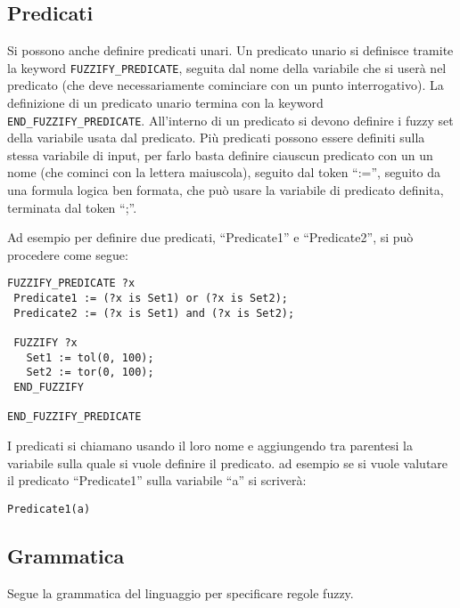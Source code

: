 \subsection{Predicati}
Si possono anche definire predicati unari. Un predicato unario si definisce tramite la keyword \verb|FUZZIFY_PREDICATE|, seguita dal nome della variabile che si userà nel predicato (che deve necessariamente cominciare con un punto interrogativo). La definizione di un predicato unario termina con la keyword \verb|END_FUZZIFY_PREDICATE|. All'interno di un predicato si devono definire i fuzzy set della variabile usata dal predicato. Più predicati possono essere definiti sulla stessa variabile di input, per farlo basta definire ciauscun predicato con un un nome (che cominci con la lettera maiuscola), seguito dal token ``:='', seguito da una formula logica ben formata, che può usare la variabile di predicato definita, terminata dal token ``;''.

Ad esempio per definire due predicati, ``Predicate1'' e ``Predicate2'', si può procedere come segue:
\begin{verbatim}
FUZZIFY_PREDICATE ?x
 Predicate1 := (?x is Set1) or (?x is Set2);
 Predicate2 := (?x is Set1) and (?x is Set2);
 
 FUZZIFY ?x
   Set1 := tol(0, 100);
   Set2 := tor(0, 100);
 END_FUZZIFY

END_FUZZIFY_PREDICATE
\end{verbatim}

I predicati si chiamano usando il loro nome e aggiungendo tra parentesi la variabile sulla quale si vuole definire il predicato. ad esempio se si vuole valutare il predicato ``Predicate1'' sulla variabile ``a'' si scriverà:
\begin{verbatim}
Predicate1(a)
\end{verbatim}


\subsection{Grammatica}

Segue la grammatica del linguaggio per specificare regole fuzzy.

